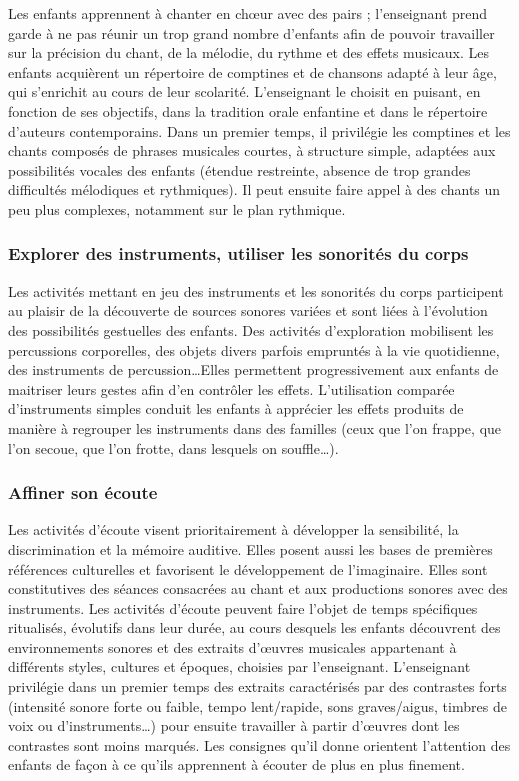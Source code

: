 Les enfants apprennent à chanter en chœur avec des pairs ; l’enseignant prend garde à ne pas réunir un trop grand nombre d'enfants afin de pouvoir travailler sur la précision du chant, de la mélodie, du rythme et des effets musicaux. Les enfants acquièrent un répertoire de comptines et de chansons adapté à leur âge, qui s'enrichit au cours de leur scolarité. L'enseignant le choisit en puisant, en fonction de ses objectifs, dans la tradition orale enfantine et dans le répertoire d'auteurs contemporains. Dans un premier temps, il privilégie les comptines et les chants composés de phrases musicales courtes, à structure simple, adaptées aux possibilités vocales des enfants (étendue restreinte, absence de trop grandes difficultés mélodiques et rythmiques). Il peut ensuite faire appel à des chants un peu plus complexes, notamment sur le plan rythmique. 

\subsubsection{Explorer des instruments, utiliser les sonorités du corps}
Les activités mettant en jeu des instruments et les sonorités du corps participent au plaisir de la découverte de sources sonores variées et sont liées à l'évolution des possibilités gestuelles des enfants. Des activités d’exploration mobilisent les percussions corporelles, des objets divers parfois empruntés à la vie quotidienne, des instruments de percussion\dots Elles permettent progressivement aux enfants de maitriser leurs gestes afin d'en contrôler les effets. L'utilisation comparée d'instruments simples conduit les enfants à apprécier les effets produits de manière à regrouper les instruments dans des familles (ceux que l'on frappe, que l'on secoue, que l'on frotte, dans lesquels on souffle\dots). 

\subsubsection{Affiner son écoute}
Les activités d'écoute visent prioritairement à développer la sensibilité, la discrimination et la mémoire auditive. Elles posent aussi les bases de premières références culturelles et favorisent le développement de l'imaginaire. Elles sont constitutives des séances consacrées au chant et aux productions sonores avec des instruments. Les activités d'écoute peuvent faire l'objet de temps spécifiques ritualisés, évolutifs dans leur durée, au cours desquels les enfants découvrent des environnements sonores et des extraits d'œuvres musicales appartenant à différents styles, cultures et époques, choisies par l’enseignant. L'enseignant privilégie dans un premier temps des extraits caractérisés par des contrastes forts (intensité sonore forte ou faible, tempo lent/rapide, sons graves/aigus, timbres de voix ou d'instruments\dots) pour ensuite travailler à partir d'œuvres dont les contrastes sont moins marqués. Les consignes qu’il donne orientent l’attention des enfants de façon à ce qu’ils apprennent à écouter de plus en plus finement.

